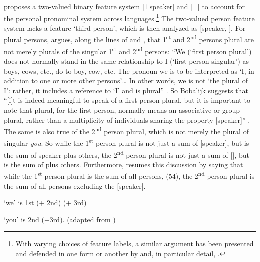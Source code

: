 \documentclass[output=paper]{langsci/langscibook}
\begin{document}
\citet{Bobaljik2008Missing} proposes a two-valued binary feature system [±speaker] and [±] to account for the personal pronominal system across languages.\footnote{With varying choices of feature labels, a similar argument has been presented and defended in one form or another by \citet{Ingram1978,Harley2002Person} and, in particular detail, \citet[Chapter~2]{Noyer1997}.} The two-valued person feature system lacks a feature ‘third person’, which is then analyzed as [\textminus{}speaker, \textminus{}]. For plural persons, \citet{Bobaljik2008Missing} argues, along the lines of \citet{Lyons1968} and \citet{Benveniste1966}, that 1\textsuperscript{st} and 2\textsuperscript{nd} persons plural are not merely plurals of the singular 1\textsuperscript{st} and 2\textsuperscript{nd} persons: “We (‘first person plural’) does not normally stand in the same relationship to I (‘first person singular’) as boys, cows, etc., do to boy, cow, etc. The pronoun we is to be interpreted as ‘I, in addition to one or more other persons’… In other words, we is not ‘the plural of I’: rather, it includes a reference to ‘I’ and is plural” \citet[277]{Lyons1968}. So Bobalijk suggests that “[i]t is indeed meaningful to speak of a first person plural, but it is important to note that plural, for the first person, normally means an associative or group plural, rather than a multiplicity of individuals sharing the property [speaker]” \citep[209]{Bobaljik2008Missing}. The same is also true of the 2\textsuperscript{nd} person plural, which is not merely the plural of singular \textit{you}. So while the 1\textsuperscript{st} person plural is not just a sum of [speaker], but is the sum of speaker plus others, the 2\textsuperscript{nd} person plural is not just a sum of [], but is the sum of  plus others. Furthermore, \citet{Bobaljik2008Missing} resumes this discussion by saying that while the 1\textsuperscript{st} person plural is the sum of all persons, (54), the 2\textsuperscript{nd} person plural is the sum of all persons excluding the [speaker].

\ea%
    \label{ex:lorusso:54}
    ‘we’ is 1st (+ 2nd) (+ 3rd) 
\z

          

\ea%
    \label{ex:lorusso:55}
    ‘you’ is 2nd (+3rd). (adapted from \citealt{Bobaljik2008Missing}) 
\z

          
\end{document}
